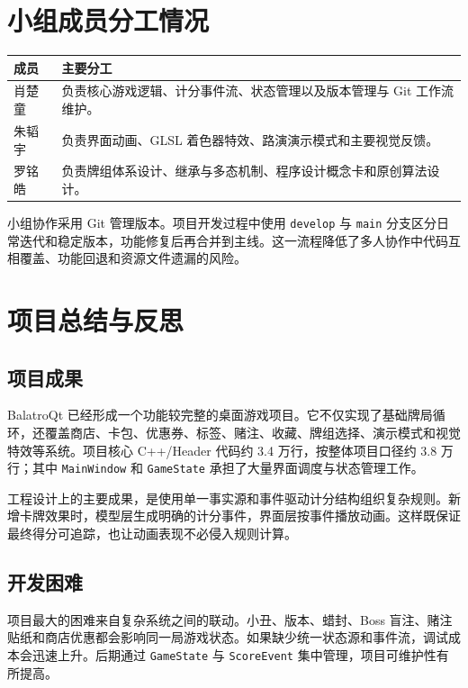 \documentclass[UTF8,11pt,a4paper]{ctexart}
\newcommand{\code}[1]{\texttt{\small #1}}
\begin{document}
\section{小组成员分工情况}

\begin{center}
\small
\begin{tabularx}{\textwidth}{L{2.6cm}Y}
\toprule
{}
成员 & 主要分工 \\
\midrule
肖楚童 & 负责核心游戏逻辑、计分事件流、状态管理以及版本管理与 Git 工作流维护。 \\
朱韬宇 & 负责界面动画、GLSL 着色器特效、路演演示模式和主要视觉反馈。 \\
罗铭皓 & 负责牌组体系设计、继承与多态机制、程序设计概念卡和原创算法设计。 \\
\bottomrule
\end{tabularx}
\end{center}

小组协作采用 Git 管理版本。项目开发过程中使用 \code{develop} 与 \code{main} 分支区分日常迭代和稳定版本，功能修复后再合并到主线。这一流程降低了多人协作中代码互相覆盖、功能回退和资源文件遗漏的风险。

\section{项目总结与反思}

\subsection{项目成果}

BalatroQt 已经形成一个功能较完整的桌面游戏项目。它不仅实现了基础牌局循环，还覆盖商店、卡包、优惠券、标签、赌注、收藏、牌组选择、演示模式和视觉特效等系统。项目核心 C++/Header 代码约 3.4 万行，按整体项目口径约 3.8 万行；其中 \code{MainWindow} 和 \code{GameState} 承担了大量界面调度与状态管理工作。

工程设计上的主要成果，是使用单一事实源和事件驱动计分结构组织复杂规则。新增卡牌效果时，模型层生成明确的计分事件，界面层按事件播放动画。这样既保证最终得分可追踪，也让动画表现不必侵入规则计算。

\subsection{开发困难}

项目最大的困难来自复杂系统之间的联动。小丑、版本、蜡封、Boss 盲注、赌注贴纸和商店优惠都会影响同一局游戏状态。如果缺少统一状态源和事件流，调试成本会迅速上升。后期通过 \code{GameState} 与 \code{ScoreEvent} 集中管理，项目可维护性有所提高。
\end{document}
